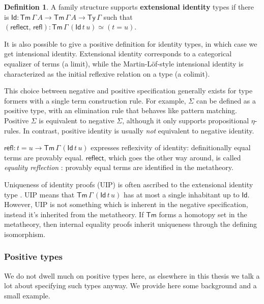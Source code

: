 \documentclass[12pt,a4paper,twoside,openany]{book}
\theoremstyle{remark}
\theoremstyle{definition}
\newtheorem{mydefinition}{Definition}
\theoremstyle{theorem}
\newcommand{\refl}{\mathsf{refl}}
\newcommand{\reflect}{\mathsf{reflect}}
\newcommand{\Tm}{\mathsf{Tm}}
\newcommand{\Ty}{\mathsf{Ty}}
\newcommand{\Id}{\mathsf{Id}}
\begin{document}
\begin{mydefinition}
A family structure supports \textbf{extensional identity} types if there is $\Id
: \Tm\,\Gamma\,A \to \Tm\,\Gamma\,A \to \Ty\,\Gamma$ such that
$(\reflect,\,\refl) : \Tm\,\Gamma\,(\Id\,t\,u) \simeq (t = u)$.
\end{mydefinition}

It is also possible to give a positive definition for identity types, in which
case we get intensional identity. Extensional identity corresponds to a
categorical equalizer of terms (a limit), while the Martin-Löf-style intensional
identity is characterized as the initial reflexive relation on a type (a
colimit).

This choice between negative and positive specification generally exists for
type formers with a single term construction rule. For example, $\Sigma$ can be
defined as a positive type, with an elimination rule that behaves like pattern
matching. Positive $\Sigma$ is equivalent to negative $\Sigma$, although it only
supports propositional $\eta$-rules. In contrast, positive identity is usually
\emph{not} equivalent to negative identity.

$\refl : t = u \to \Tm\,\Gamma\,(\Id\,t\,u)$ expresses reflexivity of identity:
definitionally equal terms are provably equal. $\reflect$, which goes the other
way around, is called \emph{equality reflection} \cite{TODO}: provably equal
terms are identified in the metatheory.

Uniqueness of identity proofs (UIP) is often ascribed to the extensional
identity type \cite{TODO}. UIP means that $\Tm\,\Gamma\,(\Id\,t\,u)$ has at most
a single inhabitant up to $\Id$. However, UIP is not something which is inherent
in the negative specification, instead it's inherited from the metatheory. If
$\Tm$ forms a homotopy set in the metatheory, then internal equality proofs
inherit uniqueness through the defining isomorphism.

\subsubsection{Positive types}

We do not dwell much on positive types here, as elsewhere in this thesis we talk
a lot about specifying such types anyway. We provide here some background and
a small example.
\end{document}
